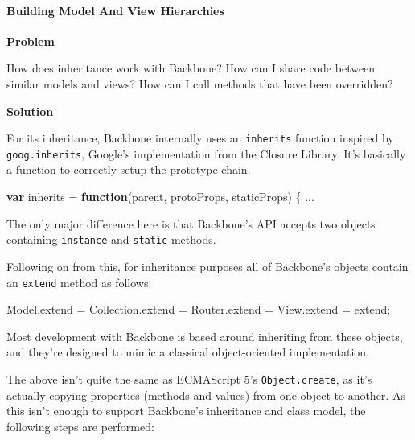 \documentclass[9pt]{book}
\newenvironment{Shaded}{}{}
\newcommand{\KeywordTok}[1]{\textcolor[rgb]{0.00,0.44,0.13}{\textbf{{#1}}}}
\newcommand{\OtherTok}[1]{\textcolor[rgb]{0.00,0.44,0.13}{{#1}}}
\newcommand{\FunctionTok}[1]{\textcolor[rgb]{0.02,0.16,0.49}{{#1}}}
\newcommand{\NormalTok}[1]{{#1}}
\begin{document}
\paragraph{Building Model And View
Hierarchies}\label{building-model-and-view-hierarchies}

\textbf{Problem}

How does inheritance work with Backbone? How can I share code between
similar models and views? How can I call methods that have been
overridden?

\textbf{Solution}

For its inheritance, Backbone internally uses an \texttt{inherits}
function inspired by \texttt{goog.inherits}, Google's implementation
from the Closure Library. It's basically a function to correctly setup
the prototype chain.

\begin{Shaded}
\begin{Highlighting}[]
 \KeywordTok{var} \NormalTok{inherits = }\KeywordTok{function}\NormalTok{(parent, protoProps, staticProps) \{}
      \NormalTok{...}
\end{Highlighting}
\end{Shaded}

The only major difference here is that Backbone's API accepts two
objects containing \texttt{instance} and \texttt{static} methods.

Following on from this, for inheritance purposes all of Backbone's
objects contain an \texttt{extend} method as follows:

\begin{Shaded}
\begin{Highlighting}[]
\OtherTok{Model}\NormalTok{.}\FunctionTok{extend} \NormalTok{= }\OtherTok{Collection}\NormalTok{.}\FunctionTok{extend} \NormalTok{= }\OtherTok{Router}\NormalTok{.}\FunctionTok{extend} \NormalTok{= }\OtherTok{View}\NormalTok{.}\FunctionTok{extend} \NormalTok{= extend;}
\end{Highlighting}
\end{Shaded}

Most development with Backbone is based around inheriting from these
objects, and they're designed to mimic a classical object-oriented
implementation.

The above isn't quite the same as ECMAScript 5's \texttt{Object.create},
as it's actually copying properties (methods and values) from one object
to another. As this isn't enough to support Backbone's inheritance and
class model, the following steps are performed:
\end{document}
